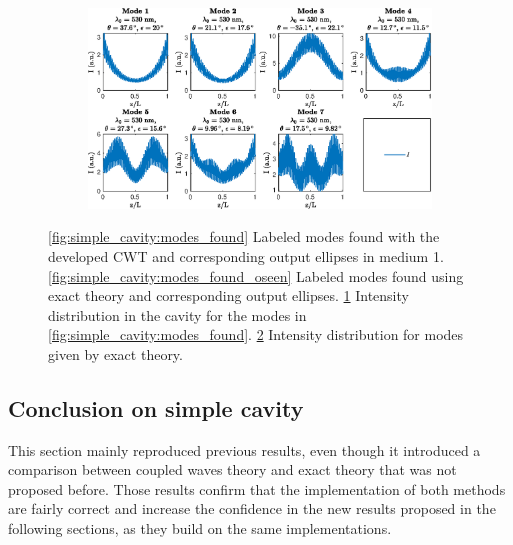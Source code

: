 \begin{figure}
\begin{subfigure}{.49\textwidth}
		\caption{}
		\label{fig:simple_cavity:intensity_distribution}
	\end{subfigure}
	\begin{subfigure}{.49\textwidth}
		\includegraphics[width=\textwidth]{plots/simple/intensity_distribution_oseen}
		\caption{}
		\label{fig:simple_cavity:intensity_distribution_oseen}
	\end{subfigure}
	\caption[Comparison of intensity distribution for a simple cavity.]{\ref{fig:simple_cavity:modes_found} Labeled modes found with the developed CWT and corresponding output ellipses in medium 1. \ref{fig:simple_cavity:modes_found_oseen} Labeled modes found using exact theory and corresponding output ellipses. \ref{fig:simple_cavity:intensity_distribution} Intensity distribution in the cavity for the modes in \ref{fig:simple_cavity:modes_found}. \ref{fig:simple_cavity:intensity_distribution_oseen} Intensity distribution for modes given by exact theory.}
	\label{fig:simple_cavity:modes}
\end{figure}

\subsection{Conclusion on simple cavity}

This section mainly reproduced previous results, even though it introduced a comparison between coupled waves theory and exact theory that was not proposed before. Those results confirm that the implementation of both methods are fairly correct and increase the confidence in the new results proposed in the following sections, as they build on the same implementations.